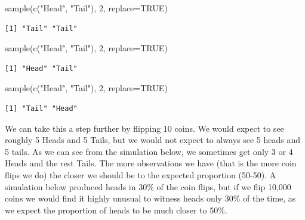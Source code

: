 \documentclass[
  letterpaper,
  DIV=11,
  numbers=noendperiod]{scrreprt}
\newenvironment{Shaded}{\begin{snugshade}}{\end{snugshade}}
\newcommand{\AttributeTok}[1]{\textcolor[rgb]{0.40,0.45,0.13}{#1}}
\newcommand{\ConstantTok}[1]{\textcolor[rgb]{0.56,0.35,0.01}{#1}}
\newcommand{\DecValTok}[1]{\textcolor[rgb]{0.68,0.00,0.00}{#1}}
\newcommand{\FunctionTok}[1]{\textcolor[rgb]{0.28,0.35,0.67}{#1}}
\newcommand{\NormalTok}[1]{\textcolor[rgb]{0.00,0.23,0.31}{#1}}
\newcommand{\StringTok}[1]{\textcolor[rgb]{0.13,0.47,0.30}{#1}}
\begin{document}
\begin{Shaded}
\begin{Highlighting}[]
\FunctionTok{sample}\NormalTok{(}\FunctionTok{c}\NormalTok{(}\StringTok{"Head"}\NormalTok{, }\StringTok{"Tail"}\NormalTok{), }\DecValTok{2}\NormalTok{, }\AttributeTok{replace=}\ConstantTok{TRUE}\NormalTok{)}
\end{Highlighting}
\end{Shaded}

\begin{verbatim}
[1] "Tail" "Tail"
\end{verbatim}

\begin{Shaded}
\begin{Highlighting}[]
\FunctionTok{sample}\NormalTok{(}\FunctionTok{c}\NormalTok{(}\StringTok{"Head"}\NormalTok{, }\StringTok{"Tail"}\NormalTok{), }\DecValTok{2}\NormalTok{, }\AttributeTok{replace=}\ConstantTok{TRUE}\NormalTok{)}
\end{Highlighting}
\end{Shaded}

\begin{verbatim}
[1] "Head" "Tail"
\end{verbatim}

\begin{Shaded}
\begin{Highlighting}[]
\FunctionTok{sample}\NormalTok{(}\FunctionTok{c}\NormalTok{(}\StringTok{"Head"}\NormalTok{, }\StringTok{"Tail"}\NormalTok{), }\DecValTok{2}\NormalTok{, }\AttributeTok{replace=}\ConstantTok{TRUE}\NormalTok{)}
\end{Highlighting}
\end{Shaded}

\begin{verbatim}
[1] "Tail" "Head"
\end{verbatim}

We can take this a step further by flipping 10 coins. We would expect to
see roughly 5 Heads and 5 Tails, but we would not expect to always see 5
heads and 5 tails. As we can see from the simulation below, we sometimes
get only 3 or 4 Heads and the rest Tails. The more observations we have
(that is the more coin flips we do) the closer we should be to the
expected proportion (50-50). A simulation below produced heads in 30\%
of the coin flips, but if we flip 10,000 coins we would find it highly
unusual to witness heads only 30\% of the time, as we expect the
proportion of heads to be much closer to 50\%.
\end{document}
